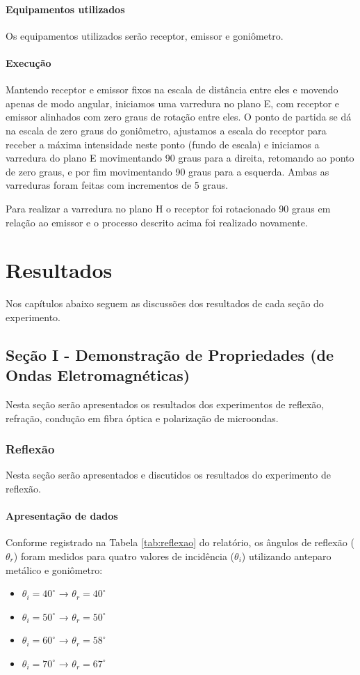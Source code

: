 \documentclass[12pt]{article}
\begin{document}
\paragraph{Equipamentos utilizados}
Os equipamentos utilizados serão receptor, emissor e goniômetro.

\paragraph{Execução}
Mantendo receptor e emissor fixos na escala de distância entre eles e
movendo apenas de modo angular, iniciamos uma varredura no plano E,
com receptor e emissor alinhados com zero graus de rotação entre
eles. O ponto de partida se dá na escala de zero graus do goniômetro,
ajustamos a escala do receptor para receber a máxima intensidade
neste ponto (fundo de escala) e iniciamos a varredura do plano E
movimentando 90 graus para a direita, retomando ao ponto de zero
graus, e por fim movimentando 90 graus para a esquerda. Ambas as
varreduras foram feitas com incrementos de 5 graus.

Para realizar a varredura no plano H o receptor foi rotacionado 90
graus em relação ao emissor e o processo descrito acima foi realizado novamente.

\section{Resultados}
Nos capítulos abaixo seguem as discussões dos resultados de cada
seção do experimento.

\subsection{Seção I - Demonstração de Propriedades (de Ondas Eletromagnéticas)}
Nesta seção serão apresentados os resultados dos experimentos de
reflexão, refração, condução em fibra óptica e polarização de
microondas.
\subsubsection{Reflexão}
Nesta seção serão apresentados e discutidos os resultados do experimento de
reflexão.
\paragraph{Apresentação de dados}
Conforme registrado na Tabela \ref{tab:reflexao} do relatório, os
ângulos de reflexão (\(\theta_r\)) foram medidos para quatro valores
de incidência (\(\theta_i\)) utilizando anteparo metálico e goniômetro:
\begin{itemize}
  \item \(\theta_i = 40^\circ\) → \(\theta_r = 40^\circ\)
  \item \(\theta_i = 50^\circ\) → \(\theta_r = 50^\circ\)
  \item \(\theta_i = 60^\circ\) → \(\theta_r = 58^\circ\)
  \item \(\theta_i = 70^\circ\) → \(\theta_r = 67^\circ\)
\end{itemize}
\end{document}
